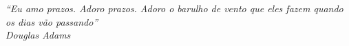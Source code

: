 \begin{epigrafe}
    \vspace*{\fill}
	\begin{flushright}
		\textit{``Eu amo prazos. Adoro prazos. Adoro o barulho de vento que eles fazem quando os dias vão passando''\\
		Douglas Adams}
	\end{flushright}
\end{epigrafe}
